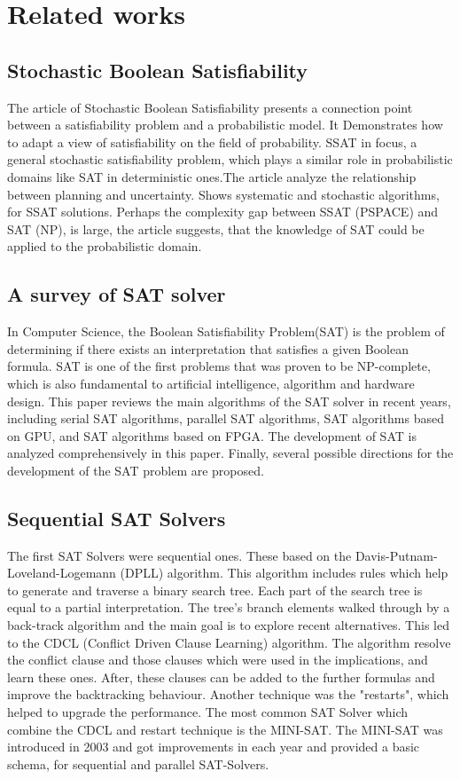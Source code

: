 \documentclass[12pt] {article}
\begin{document}
\section{Related works}

\subsection{Stochastic Boolean Satisfiability}

The article of Stochastic Boolean Satisfiability presents a connection point between a satisfiability problem and a probabilistic model. It Demonstrates how to adapt a view of satisfiability on the field of probability. SSAT in focus, a general stochastic satisfiability problem, which plays a similar role in probabilistic domains like SAT in deterministic ones.The article analyze the relationship between planning and uncertainty. Shows systematic and stochastic algorithms, for SSAT solutions. Perhaps the complexity gap between SSAT (PSPACE) and SAT (NP), is large, the article suggests, that the knowledge of SAT could be applied to the probabilistic domain.

\subsection{A survey of SAT solver}

In Computer Science, the Boolean Satisfiability Problem(SAT) is the problem of determining if there exists an interpretation that satisfies a given Boolean formula. SAT is one of the first problems that was proven to be NP-complete, which is also fundamental to artificial intelligence, algorithm and hardware design. This paper reviews the main algorithms of the SAT solver in recent years, including serial SAT algorithms, parallel SAT algorithms, SAT algorithms based on GPU, and SAT algorithms based on FPGA. The development of SAT is analyzed comprehensively in this paper. Finally, several possible directions for the development of the SAT problem are proposed.

\subsection{Sequential SAT Solvers}

The first SAT Solvers were sequential ones. These based on the Davis-Putnam-Loveland-Logemann (DPLL) algorithm. This algorithm includes rules which help to generate and traverse a binary search tree. Each part of the search tree is equal to a partial interpretation. The tree's branch elements walked through by a back-track algorithm and the main goal is to explore recent alternatives. This led to the CDCL (Conflict Driven Clause Learning) algorithm. The algorithm resolve the conflict clause and those clauses which were used in the implications, and learn these ones. After, these clauses can be added to the further formulas and improve the backtracking behaviour. Another technique was the "restarts", which helped to upgrade the performance. The most common SAT Solver which combine the CDCL and restart technique is the MINI-SAT. The MINI-SAT was introduced in 2003 and got improvements in each year and provided a basic schema, for sequential and parallel SAT-Solvers.
\end{document}
